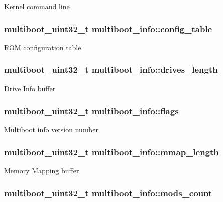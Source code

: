 Kernel command line \hypertarget{structmultiboot__info_a919ce01f85d05ab90857f8591dfb3948}{
\subsubsection[{config\-\_\-table}]{\setlength{\rightskip}{0pt plus 5cm}multiboot\-\_\-uint32\-\_\-t multiboot\-\_\-info\-::config\-\_\-table}}\label{structmultiboot__info_a919ce01f85d05ab90857f8591dfb3948}
R\-O\-M configuration table \hypertarget{structmultiboot__info_abe859eaa7e97309f072b3bc1caf5742e}{
\subsubsection[{drives\-\_\-length}]{\setlength{\rightskip}{0pt plus 5cm}multiboot\-\_\-uint32\-\_\-t multiboot\-\_\-info\-::drives\-\_\-length}}\label{structmultiboot__info_abe859eaa7e97309f072b3bc1caf5742e}
Drive Info buffer \hypertarget{structmultiboot__info_aa562865bc325fd785c9fa4c5056294f3}{
\subsubsection[{flags}]{\setlength{\rightskip}{0pt plus 5cm}multiboot\-\_\-uint32\-\_\-t multiboot\-\_\-info\-::flags}}\label{structmultiboot__info_aa562865bc325fd785c9fa4c5056294f3}
Multiboot info version number \hypertarget{structmultiboot__info_a86a0d881c5233a4b1c8cd690ccd19b75}{
\subsubsection[{mmap\-\_\-length}]{\setlength{\rightskip}{0pt plus 5cm}multiboot\-\_\-uint32\-\_\-t multiboot\-\_\-info\-::mmap\-\_\-length}}\label{structmultiboot__info_a86a0d881c5233a4b1c8cd690ccd19b75}
Memory Mapping buffer \hypertarget{structmultiboot__info_aebdafce31f94277d138202f7b1ec35cc}{
\subsubsection[{mods\-\_\-count}]{\setlength{\rightskip}{0pt plus 5cm}multiboot\-\_\-uint32\-\_\-t multiboot\-\_\-info\-::mods\-\_\-count}}\label{structmultiboot__info_aebdafce31f94277d138202f7b1ec35cc}
